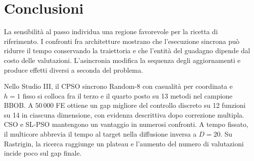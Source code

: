 \section{Conclusioni}\label{sec:conclusions}
La sensibilità al passo individua una regione favorevole per la ricetta di riferimento. I confronti fra architetture mostrano che l'esecuzione sincrona può ridurre il tempo conservando la traiettoria e che l'entità del guadagno dipende dal costo delle valutazioni. L'asincronia modifica la sequenza degli aggiornamenti e produce effetti diversi a seconda del problema.

Nello Studio III, il CPSO sincrono Random-8 con casualità per coordinata e $h=1$ fisso si colloca fra il terzo e il quarto posto su 13 metodi nel campione BBOB. A $50\,000$ FE ottiene un gap migliore del controllo discreto su 12 funzioni su 14 in ciascuna dimensione, con evidenza descrittiva dopo correzione multipla. CSO e SL-PSO mantengono un vantaggio in numerosi confronti. A tempo fissato, il multicore abbrevia il tempo al target nella diffusione inversa a $D=20$. Su Rastrigin, la ricerca raggiunge un plateau e l'aumento del numero di valutazioni incide poco sul gap finale.
